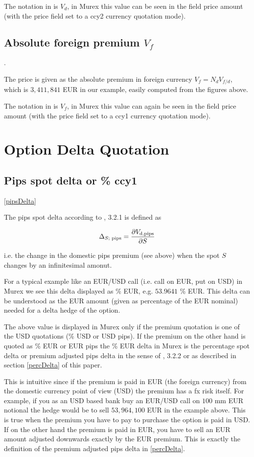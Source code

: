 \documentclass{amsart}
\theoremstyle{plain}
\numberwithin{equation}{section}
\begin{document}
The notation in \cite{Clark} is $V_d$, in Murex this value can be seen in the field price amount (with the price
field set to a ccy2 currency quotation mode).

\subsection{Absolute foreign premium $V_f$}.

The price is given as the absolute premium in foreign currency $V_f = N_d V_{f/d}$, which is $3,411,841$ EUR in
our example, easily computed from the figures above.

The notation in \cite{Clark} is $V_f$, in Murex this value can again be seen in the field price amount (with the
price field set to a ccy1 currency quotation mode).

\section{Option Delta Quotation}

\subsection{Pips spot delta or \% ccy1}
\ref{pipsDelta}

The pips spot delta according to \cite{Clark}, 3.2.1 is defined as

\begin{equation}
\Delta_{S\textnormal{; pips}} = \frac{\partial V_{\textnormal{d,pips}}}{\partial S}
\end{equation}

i.e. the change in the domestic pips premium (see above) when the spot $S$ changes by an infinitesimal amonut.

For a typical example like an EUR/USD call (i.e. call on EUR, put on USD) in Murex we see this delta displayed
as \% EUR, e.g. $53.9641$ \% EUR. This delta can be understood as the EUR amount (given as percentage of the
EUR nominal) needed for a delta hedge of the option.

The above value is displayed in Murex only if the premium quotation is one of the USD quotations (\% USD or
USD pips). If the premium on the other hand is quoted as \% EUR or EUR pips the \% EUR delta in Murex is
the percentage spot delta or premium adjusted pips delta in the sense of \cite{Clark}, 3.2.2 or as described
in section \ref{percDelta} of this paper.

This is intuitive since if the premium is paid in EUR (the foreign currency) from the domestic currency
point of view (USD) the premium has a fx risk itself. For example, if you as an USD based bank buy an
EUR/USD call on $100$ mm EUR notional the hedge would be to sell $53,964,100$ EUR in the example above.
This is true when the premium you have to pay to purchase the option is paid in USD. If on the other
hand the premium is paid in EUR, you have to sell an EUR amount adjusted downwards exactly by the EUR premium.
This is exactly the definition of the premium adjusted pips delta in \ref{percDelta}.
\end{document}

